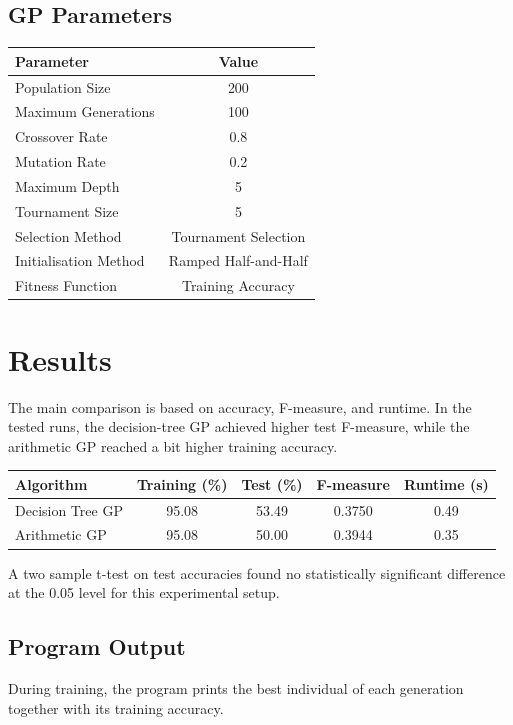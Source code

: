 \documentclass{article}
\begin{document}
\subsection{GP Parameters}
\begin{center}
    \begin{tabular}{lc}
        \toprule
        Parameter & Value \\
        \midrule
        Population Size & 200 \\
        Maximum Generations & 100 \\
        Crossover Rate & 0.8 \\
        Mutation Rate & 0.2 \\
        Maximum Depth & 5 \\
        Tournament Size & 5 \\
        Selection Method & Tournament Selection \\
        Initialisation Method & Ramped Half-and-Half \\
        Fitness Function & Training Accuracy \\
        \bottomrule
    \end{tabular}
\end{center}

\section{Results}
The main comparison is based on accuracy, F-measure, and runtime.
In the tested runs, the decision-tree GP achieved higher test F-measure, while the arithmetic GP reached a bit higher training accuracy.

\begin{center}
\begin{tabular}{lcccc}
\toprule
Algorithm & Training (\%) & Test (\%) & F-measure & Runtime (s) \\
\midrule
Decision Tree GP & 95.08 & 53.49 & 0.3750 & 0.49 \\
Arithmetic GP & 95.08 & 50.00 & 0.3944 & 0.35 \\
\bottomrule
\end{tabular}
\end{center}

A two sample t-test on test accuracies found no statistically significant difference at 
the 0.05 level for this experimental setup.

\subsection{Program Output}
During training, the program prints the best individual of each generation together with its training accuracy.
\end{document}
